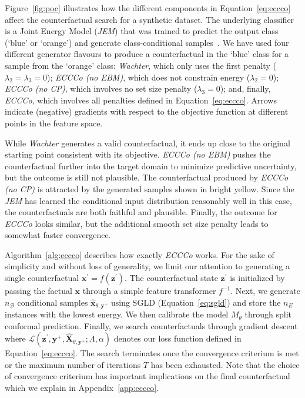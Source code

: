 Figure~\ref{fig:poc} illustrates how the different components in Equation~\ref{eq:eccco} affect the counterfactual search for a synthetic dataset. The underlying classifier is a Joint Energy Model (\textit{JEM}) that was trained to predict the output class (`blue' or `orange') and generate class-conditional samples~\citep{grathwohl2020your}. We have used four different generator flavours to produce a counterfactual in the `blue' class for a sample from the `orange' class: \textit{Wachter}, which only uses the first penalty ($\lambda_2=\lambda_3=0$); \textit{ECCCo (no EBM)}, which does not constrain energy ($\lambda_2=0$); \textit{ECCCo (no CP)}, which involves no set size penalty ($\lambda_3=0$); and, finally, \textit{ECCCo}, which involves all penalties defined in Equation~\ref{eq:eccco}. Arrows indicate (negative) gradients with respect to the objective function at different points in the feature space. 

While \textit{Wachter} generates a valid counterfactual, it ends up close to the original starting point consistent with its objective. \textit{ECCCo (no EBM)} pushes the counterfactual further into the target domain to minimize predictive uncertainty, but the outcome is still not plausible. The counterfactual produced by \textit{ECCCo (no CP)} is attracted by the generated samples shown in bright yellow. Since the \textit{JEM} has learned the conditional input distribution reasonably well in this case, the counterfactuals are both faithful and plausible. Finally, the outcome for \textit{ECCCo} looks similar, but the additional smooth set size penalty leads to somewhat faster convergence. 

Algorithm~\ref{alg:eccco} describes how exactly \textit{ECCCo} works. For the sake of simplicity and without loss of generality, we limit our attention to generating a single counterfactual $\mathbf{x}^\prime=f(\mathbf{z}^\prime)$. The counterfactual state $\mathbf{z}^\prime$ is initialized by passing the factual $\mathbf{x}$ through a simple feature transformer $f^{-1}$. Next, we generate $n_{\mathcal{B}}$ conditional samples $\hat{\mathbf{x}}_{\theta,\mathbf{y}^+}$ using SGLD (Equation~\ref{eq:sgld}) and store the $n_E$ instances with the lowest energy. We then calibrate the model $M_{\theta}$ through split conformal prediction. Finally, we search counterfactuals through gradient descent where $\mathcal{L}(\mathbf{z}^\prime,\mathbf{y}^+,\widehat{\mathbf{X}}_{\theta,\mathbf{y}^+}; \Lambda, \alpha)$ denotes our loss function defined in Equation~\ref{eq:eccco}. The search terminates once the convergence criterium is met or the maximum number of iterations $T$ has been exhausted. Note that the choice of convergence criterium has important implications on the final counterfactual which we explain in Appendix~\ref{app:eccco}.

